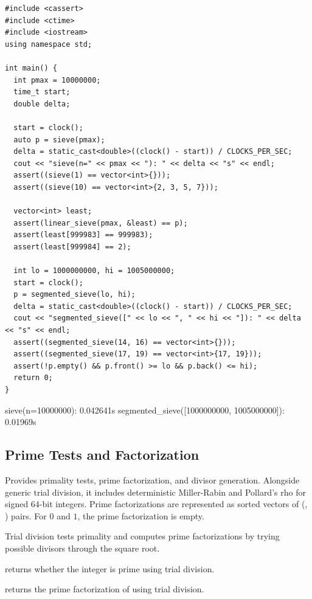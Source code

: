 \begin{lstlisting}[style=cpp]
#include <cassert>
#include <ctime>
#include <iostream>
using namespace std;

int main() {
  int pmax = 10000000;
  time_t start;
  double delta;

  start = clock();
  auto p = sieve(pmax);
  delta = static_cast<double>((clock() - start)) / CLOCKS_PER_SEC;
  cout << "sieve(n=" << pmax << "): " << delta << "s" << endl;
  assert((sieve(1) == vector<int>{}));
  assert((sieve(10) == vector<int>{2, 3, 5, 7}));

  vector<int> least;
  assert(linear_sieve(pmax, &least) == p);
  assert(least[999983] == 999983);
  assert(least[999984] == 2);

  int lo = 1000000000, hi = 1005000000;
  start = clock();
  p = segmented_sieve(lo, hi);
  delta = static_cast<double>((clock() - start)) / CLOCKS_PER_SEC;
  cout << "segmented_sieve([" << lo << ", " << hi << "]): " << delta << "s" << endl;
  assert((segmented_sieve(14, 16) == vector<int>{}));
  assert((segmented_sieve(17, 19) == vector<int>{17, 19}));
  assert(!p.empty() && p.front() >= lo && p.back() <= hi);
  return 0;
}
\end{lstlisting}
\begin{exampleoutput}
sieve(n=10000000): 0.042641s
segmented_sieve([1000000000, 1005000000]): 0.01969s
\end{exampleoutput}
\subsection{Prime Tests and Factorization}
\label{sec:6.3.9}
Provides primality tests, prime factorization, and divisor generation. Alongside generic trial division, it includes deterministic Miller-Rabin and Pollard's rho for signed 64-bit integers. Prime factorizations are represented as sorted vectors of (, ) pairs. For $0$ and $1$, the prime factorization is empty.

Trial division tests primality and computes prime factorizations by trying possible divisors through the square root.

\begin{compactitem}
  \item {} returns whether the integer  is prime using trial division.
  \item {} returns the prime factorization of  using trial division.
\end{compactitem}

